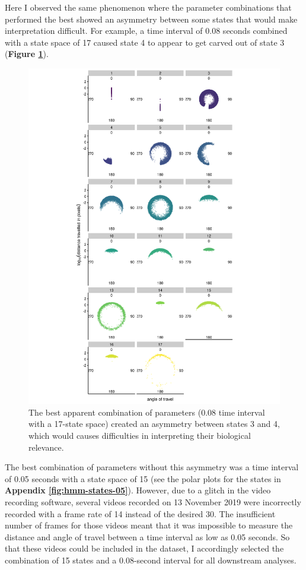 \documentclass[
]{book}
\begin{document}
Here I observed the same phenomenon where the parameter combinations that performed the best showed an asymmetry between some states that would make interpretation difficult. For example, a time interval of 0.08 seconds combined with a state space of 17 caused state 4 to appear to get carved out of state 3 (\textbf{Figure \ref{fig:mikk-hmm-asym}}).



\begin{figure}
\includegraphics[width=1\linewidth]{figs/mikk_behaviour/0.08_17_polar_all_dge} \caption{The best apparent combination of parameters (0.08 time interval with a 17-state space) created an asymmetry between states 3 and 4, which would causes difficulties in interpreting their biological relevance.}\label{fig:mikk-hmm-asym}
\end{figure}

The best combination of parameters without this asymmetry was a time interval of 0.05 seconds with a state space of 15 (see the polar plots for the states in \textbf{Appendix \ref{fig:hmm-states-05}}). However, due to a glitch in the video recording software, several videos recorded on 13 November 2019 were incorrectly recorded with a frame rate of 14 instead of the desired 30. The insufficient number of frames for those videos meant that it was impossible to measure the distance and angle of travel between a time interval as low as 0.05 seconds. So that these videos could be included in the dataset, I accordingly selected the combination of 15 states and a 0.08-second interval for all downstream analyses.
\end{document}
